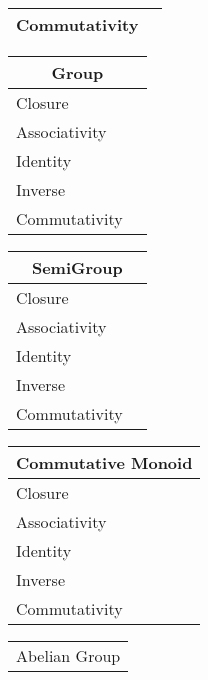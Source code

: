 \documentclass[a4paper,12pt]{scrartcl}    %
\begin{document}
\begin{landscape}
\begin{minipage}[t][]{0.60 \linewidth}
\begin{minipage}[c]{0,5\textwidth}
\begin{tabular}{|l|p{2cm}|}
			    \cellcolor{red!25} Commutativity&  \\
			  \hline
			\end{tabular}
			\vfill
			\begin{tabular}{|l|p{2cm}|} %
			  \hline
			  \multicolumn{2}{c}{\cellcolor{yellow!25}Group} \\
			  \hline
			   \cellcolor{blue!25} Closure&  \\
			    \cellcolor{blue!25} Associativity&  \\
			    \cellcolor{blue!25} Identity&  \\
			    \cellcolor{blue!25} Inverse&  \\
			    \cellcolor{red!25} Commutativity&  \\
			  \hline
			\end{tabular}
		\end{minipage}
		\hspace{1cm}
		\begin{minipage}[c]{0,5\textwidth}	
\begin{tabular}{|l|p{2cm}|} %
			  \hline
			  \multicolumn{2}{c}{\cellcolor{yellow!25}SemiGroup} \\
			  \hline
			   \cellcolor{blue!25} Closure&  \\
			    \cellcolor{blue!25} Associativity&  \\
			    \cellcolor{red!25} Identity&  \\
			    \cellcolor{red!25} Inverse&  \\
			    \cellcolor{red!25} Commutativity&  \\
			  \hline
			\end{tabular}
			\vfill
			\begin{tabular}{|l|p{2cm}|} %
			  \hline
			  \multicolumn{2}{c}{\cellcolor{yellow!25}Commutative Monoid} \\
			  \hline
			   \cellcolor{blue!25} Closure&  \\
			    \cellcolor{blue!25} Associativity&  \\
			    \cellcolor{blue!25} Identity&  \\
			    \cellcolor{red!25} Inverse&  \\
			    \cellcolor{blue!25} Commutativity&  \\
			  \hline
			\end{tabular}
			\vfill
			\begin{tabular}{|l|p{2cm}|} %
			  \hline
			  \multicolumn{2}{c}{\cellcolor{yellow!25}Abelian Group} \\

\end{tabular}
\end{minipage}
\end{minipage}
\end{landscape}
\end{document}

